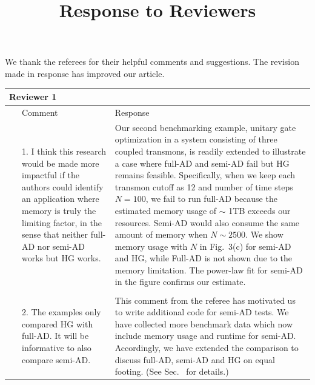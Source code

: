 \documentclass{article}
\title{Response to Reviewers}
\date{}
\author{}
\newcommand{\RNum}[1]
{\uppercase\expandafter{\romannumeral #1\relax}}
\begin{document}
\maketitle
\noindent We thank the referees for their helpful comments and suggestions. The revision made in response has improved our article.

\begin{center}
\begin{longtable}{cp{5.50cm}p{11.5cm}} 
\multicolumn{3}{l}{\textbf{Reviewer 1}}  \\
\hline
~ & {\color{grey}Comment} & Response \\
\hline
~ & {\color{grey}
1. I think this research would be made more impactful if the authors could identify an application where memory is truly the limiting factor, in the sense that neither full-AD nor semi-AD works but HG works. }

& 

Our second benchmarking example, unitary gate optimization in a system consisting of three coupled transmons, is readily extended to illustrate a case where full-AD and semi-AD fail but HG remains feasible. Specifically, when we keep each transmon cutoff as 12 and number of time steps $N=100$, we fail to run full-AD because the estimated memory usage of $\sim$ 1TB exceeds our resources. Semi-AD would also consume the same amount of memory when $N\sim2500$. We show memory usage with $N$ in Fig.\ 3(c) for semi-AD and HG, while Full-AD is not shown due to the memory limitation. The power-law fit for semi-AD in the figure confirms our estimate.
\\
\multicolumn{3}{l}{}  \\
~ & {\color{grey}
2. The examples only compared HG with full-AD. It will be informative to also compare semi-AD.}
&
This comment from the referee has motivated us to write additional code for semi-AD tests.  We have collected more benchmark data which now include memory usage and runtime for semi-AD. Accordingly, we have extended the comparison to discuss full-AD, semi-AD and HG on equal footing. (See Sec.\ \RNum{4} for details.)
 


\end{longtable}
\end{center}
\end{document}
